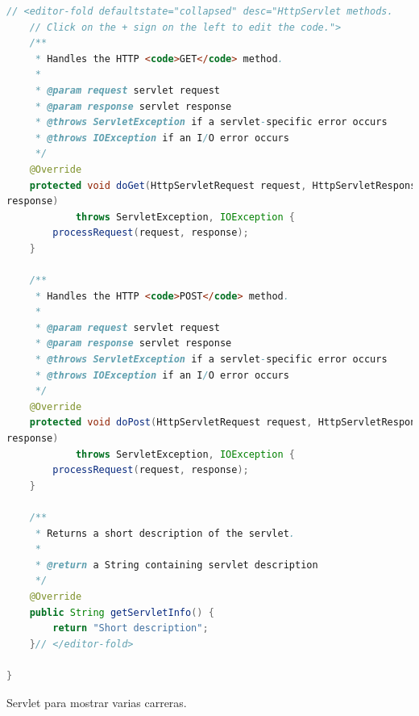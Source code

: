 \documentclass[a4paper,12pt]{article}
\begin{document}
\begin{lstlisting}[language=Java, style=customJava, 
caption={EditarCarrera.java},captionpos=b,basicstyle=\fontfamily{cmss}\small]
    // <editor-fold defaultstate="collapsed" desc="HttpServlet methods. 
    // Click on the + sign on the left to edit the code.">
    /**
     * Handles the HTTP <code>GET</code> method.
     *
     * @param request servlet request
     * @param response servlet response
     * @throws ServletException if a servlet-specific error occurs
     * @throws IOException if an I/O error occurs
     */
    @Override
    protected void doGet(HttpServletRequest request, HttpServletResponse 
response)
            throws ServletException, IOException {
        processRequest(request, response);
    }

    /**
     * Handles the HTTP <code>POST</code> method.
     *
     * @param request servlet request
     * @param response servlet response
     * @throws ServletException if a servlet-specific error occurs
     * @throws IOException if an I/O error occurs
     */
    @Override
    protected void doPost(HttpServletRequest request, HttpServletResponse 
response)
            throws ServletException, IOException {
        processRequest(request, response);
    }

    /**
     * Returns a short description of the servlet.
     *
     * @return a String containing servlet description
     */
    @Override
    public String getServletInfo() {
        return "Short description";
    }// </editor-fold>

}

\end{lstlisting}

Servlet para mostrar varias carreras.
\end{document}
